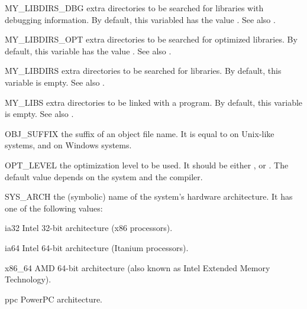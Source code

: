 \documentclass[a4paper,10pt]{article}
\begin{document}
\begin{Description}[\Code]
\item[MY_LIBDIRS_DBG] \label{makevar:MY-LIBDIRS-DBG} extra directories
  to be searched for libraries with debugging information. By default,
  this variabled has the value . See also
  \hyperref[makevar:LIBDIRS-DBG]{}.

\item[MY_LIBDIRS_OPT] \label{makevar:MY-LIBDIRS-OPT} extra directories
  to be searched for optimized libraries. By default, this variable
  has the value . See also
  \hyperref[makevar:LIBDIRS-OPT]{}.

\item[MY_LIBDIRS] \label{makevar:MY-LIBDIRS} extra directories to be
  searched for libraries. By default, this variable is empty. See also
  \hyperref[makevar:LIBDIRS]{}.

\item[MY_LIBS] \label{makevar:MY-LIBS} extra directories to be linked
  with a program. By default, this variable is empty. See also
  \hyperref[makevar:LIBS]{}.

\item[OBJ_SUFFIX] \label{makevar:OBJ-SUFFIX} the suffix of an object
  file name. It is equal to  on Unix-like systems, and
   on Windows systems.

\item[OPT_LEVEL] \label{makevar:OPT-LEVEL} the optimization level to
  be used. It should be either ,  or . The
  default value depends on the system and the compiler.

\item[SYS_ARCH] \label{makevar:SYS-ARCH} the (symbolic) name of the
  system's hardware architecture. It has one of the following values:
  \begin{Description}[\Code]

  \item[ia32]   Intel 32-bit architecture (x86 processors).

  \item[ia64]   Intel 64-bit architecture (Itanium processors).

  \item[x86_64] AMD 64-bit architecture (also known as Intel Extended
    Memory Technology).

  \item[ppc]    PowerPC architecture.

  \end{Description}


\end{Description}
\end{document}
